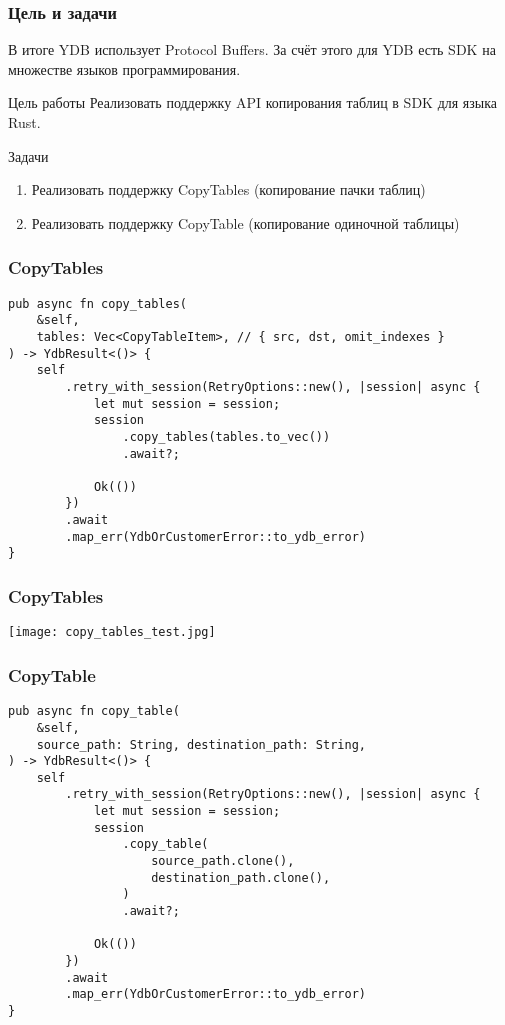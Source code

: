 \begin{frame}\frametitle{Цель и задачи}
    \begin{block}{В итоге}
        YDB использует Protocol Buffers. За счёт этого для YDB есть SDK на множестве языков программирования.
    \end{block}

    \begin{block}{Цель работы}
        Реализовать поддержку API копирования таблиц в SDK для языка Rust.
    \end{block}

    \begin{block}{Задачи}
        \begin{enumerate}
            \item Реализовать поддержку CopyTables (копирование пачки таблиц)
            \item Реализовать поддержку CopyTable (копирование одиночной таблицы)
        \end{enumerate}
    \end{block}
\end{frame}

\begin{frame}[fragile]\frametitle{CopyTables}
    \begin{lstlisting}
pub async fn copy_tables(
    &self,
    tables: Vec<CopyTableItem>, // { src, dst, omit_indexes }
) -> YdbResult<()> {
    self
        .retry_with_session(RetryOptions::new(), |session| async {
            let mut session = session;
            session
                .copy_tables(tables.to_vec())
                .await?;

            Ok(())
        })
        .await
        .map_err(YdbOrCustomerError::to_ydb_error)
}
    \end{lstlisting}
\end{frame}

\begin{frame}\frametitle{CopyTables}
    \texttt{[image: copy\_tables\_test.jpg]}
\end{frame}

\begin{frame}[fragile]\frametitle{CopyTable}
    \begin{lstlisting}
pub async fn copy_table(
    &self,
    source_path: String, destination_path: String,
) -> YdbResult<()> {
    self
        .retry_with_session(RetryOptions::new(), |session| async {
            let mut session = session;
            session
                .copy_table(
                    source_path.clone(),
                    destination_path.clone(),
                )
                .await?;

            Ok(())
        })
        .await
        .map_err(YdbOrCustomerError::to_ydb_error)
}
    \end{lstlisting}
\end{frame}

